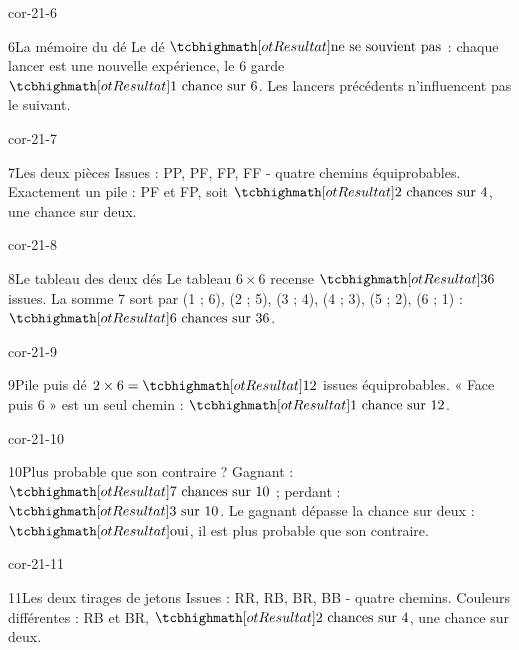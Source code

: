 \begin{blocLivre}{cor-21-6}\begin{corrige}{6}{La mémoire du dé}
Le dé $\res{\text{ne se souvient pas}}$ : chaque lancer est une nouvelle expérience, le 6 garde $\res{1\ \text{chance sur }6}$. Les lancers précédents n’influencent pas le suivant.
\end{corrige}\end{blocLivre}
\begin{blocLivre}{cor-21-7}\begin{corrige}{7}{Les deux pièces}
Issues : PP, PF, FP, FF - quatre chemins équiprobables. Exactement un pile : PF et FP, soit $\res{2\ \text{chances sur }4}$, une chance sur deux.
\label{fig-cor-21-7}
\end{corrige}\end{blocLivre}
\begin{blocLivre}{cor-21-8}\begin{corrige}{8}{Le tableau des deux dés}
Le tableau $6\times6$ recense $\res{36}$ issues. La somme 7 sort par (1 ; 6), (2 ; 5), (3 ; 4), (4 ; 3), (5 ; 2), (6 ; 1) : $\res{6\ \text{chances sur }36}$.
\label{fig-cor-21-8}
\end{corrige}\end{blocLivre}
\begin{blocLivre}{cor-21-9}\begin{corrige}{9}{Pile puis dé}
$2\times6=\res{12}$ issues équiprobables. « Face puis 6 » est un seul chemin : $\res{1\ \text{chance sur }12}$.
\end{corrige}\end{blocLivre}
\begin{blocLivre}{cor-21-10}\begin{corrige}{10}{Plus probable que son contraire ?}
Gagnant : $\res{7\ \text{chances sur }10}$ ; perdant : $\res{3\ \text{sur }10}$. Le gagnant dépasse la chance sur deux : $\res{\text{oui}}$, il est plus probable que son contraire.
\end{corrige}\end{blocLivre}
\begin{blocLivre}{cor-21-11}\begin{corrige}{11}{Les deux tirages de jetons}
Issues : RR, RB, BR, BB - quatre chemins. Couleurs différentes : RB et BR, $\res{2\ \text{chances sur }4}$, une chance sur deux.
\label{fig-cor-21-11}
\end{corrige}\end{blocLivre}
